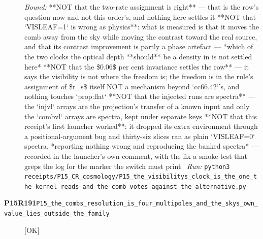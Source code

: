 \begin{description}
 \emph{Bound:}  **NOT that the two-rate assignment is right** --- that is the row's question now and not this order's, and nothing here settles it  **NOT that `VISLEAF=1` is wrong as physics**: what is measured is that it moves the comb away from the sky while moving the contrast toward the real source, and that its contrast improvement is partly a phase artefact --- *which of the two clocks the optical depth **should** be a density in is not settled here*  **NOT that the \$0.06\$ per cent invariance settles the row** --- it says the visibility is not where the freedom is; the freedom is in the rule's assignment of \$r\_s\$ itself  NOT a mechanism beyond `cc66.42`'s, and nothing touches `prop:flat`  **NOT that the injected runs are spectra** --- the `injvl` arrays are the projection's transfer of a known input and only the `combvl` arrays are spectra, kept under separate keys  **NOT that this receipt's first launcher worked**: it dropped its extra environment through a positional-argument bug and thirty-six slices ran as plain `VISLEAF=0` spectra, *reporting nothing wrong and reproducing the banked spectra* --- recorded in the launcher's own comment, with the fix a smoke test that greps the log for the marker the switch must print
\ \emph{Run:} \texttt{python3 receipts/P15\_CR\_cosmology/P15\_the\_visibilitys\_clock\_is\_the\_one\_the\_kernel\_reads\_and\_the\_comb\_votes\_against\_the\_alternative.py}
\item[\rcptlabel{P15_the_combs_resolution_is_four_multipoles_and_the_skys_own_value_lies_outside_the_family}{P15R191}\textbf{P15R191}\quad\texttt{P15\_the\_combs\_resolution\_is\_four\_multipoles\_and\_the\_skys\_own\_value\_lies\_outside\_the\_family}]\hfill\textsf{[OK]}\\

\end{description}
